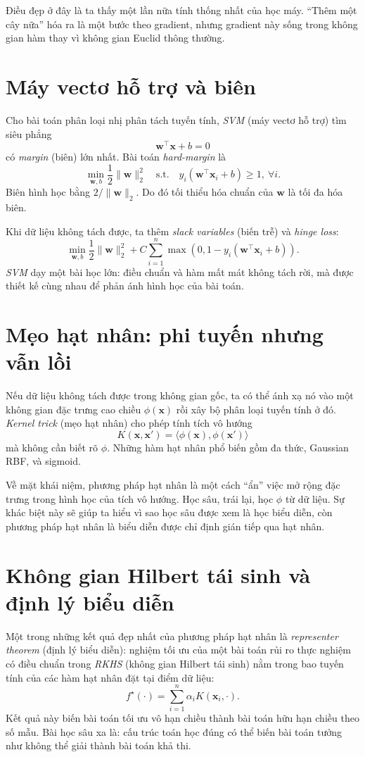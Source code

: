 Điều đẹp ở đây là ta thấy một lần nữa tính thống nhất của học máy. ``Thêm một cây nữa'' hóa ra là một bước theo gradient, nhưng gradient này sống trong không gian hàm thay vì không gian Euclid thông thường.

\section{Máy vectơ hỗ trợ và biên}

Cho bài toán phân loại nhị phân tách tuyến tính, \emph{SVM} (máy vectơ hỗ trợ) tìm siêu phẳng
\[
\bm{w}^\top \bm{x} + b = 0
\]
có \emph{margin} (biên) lớn nhất. Bài toán \emph{hard-margin} là
\[
\min_{\bm{w},b}\frac{1}{2}\|\bm{w}\|_2^2
\quad\text{s.t.}\quad
y_i(\bm{w}^\top \bm{x}_i+b)\ge 1,\ \forall i.
\]
Biên hình học bằng \(2/\|\bm{w}\|_2\). Do đó tối thiểu hóa chuẩn của \(\bm{w}\) là tối đa hóa biên.

Khi dữ liệu không tách được, ta thêm \emph{slack variables} (biến trễ) và \emph{hinge loss}:
\[
\min_{\bm{w},b}\frac{1}{2}\|\bm{w}\|_2^2 + C\sum_{i=1}^n \max(0,1-y_i(\bm{w}^\top \bm{x}_i+b)).
\]
\emph{SVM} dạy một bài học lớn: điều chuẩn và hàm mất mát không tách rời, mà được thiết kế cùng nhau để phản ánh hình học của bài toán.

\section{Mẹo hạt nhân: phi tuyến nhưng vẫn lồi}

Nếu dữ liệu không tách được trong không gian gốc, ta có thể ánh xạ nó vào một không gian đặc trưng cao chiều \(\phi(\bm{x})\) rồi xây bộ phân loại tuyến tính ở đó. \emph{Kernel trick} (mẹo hạt nhân) cho phép tính tích vô hướng
\[
K(\bm{x},\bm{x}')=\langle \phi(\bm{x}),\phi(\bm{x}')\rangle
\]
mà không cần biết rõ \(\phi\). Những hàm hạt nhân phổ biến gồm đa thức, Gaussian RBF, và sigmoid.

Về mặt khái niệm, phương pháp hạt nhân là một cách ``ẩn'' việc mở rộng đặc trưng trong hình học của tích vô hướng. Học sâu, trái lại, học \(\phi\) từ dữ liệu. Sự khác biệt này sẽ giúp ta hiểu vì sao học sâu được xem là học biểu diễn, còn phương pháp hạt nhân là biểu diễn được chỉ định gián tiếp qua hạt nhân.

\section{Không gian Hilbert tái sinh và định lý biểu diễn}

Một trong những kết quả đẹp nhất của phương pháp hạt nhân là \emph{representer theorem} (định lý biểu diễn): nghiệm tối ưu của một bài toán rủi ro thực nghiệm có điều chuẩn trong \emph{RKHS} (không gian Hilbert tái sinh) nằm trong bao tuyến tính của các hàm hạt nhân đặt tại điểm dữ liệu:
\[
f^\star(\cdot)=\sum_{i=1}^n \alpha_i K(\bm{x}_i,\cdot).
\]
Kết quả này biến bài toán tối ưu vô hạn chiều thành bài toán hữu hạn chiều theo số mẫu. Bài học sâu xa là: cấu trúc toán học đúng có thể biến bài toán tưởng như không thể giải thành bài toán khả thi.

